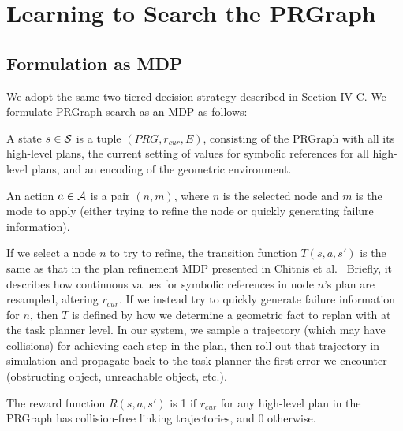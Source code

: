 \section{Learning to Search the PRGraph}
\subsection{Formulation as MDP}
We adopt the same two-tiered decision strategy described in Section IV-C.
We formulate PRGraph search as an MDP as follows:
\begin{tightlist}
\item A state $s \in \mathcal{S}$ is a tuple $(PRG, r_{cur}, E)$, consisting of the
PRGraph with all its high-level plans, the current setting of
values for symbolic references for all high-level plans, and
an encoding of the geometric environment.
\item An action $a \in \mathcal{A}$ is a pair $(n, m)$, where $n$ is the selected node and $m$ is
the mode to apply (either trying to refine the node or quickly generating failure information).
\item If we select a node $n$ to try to refine, the transition function $T(s, a, s')$ is the same
as that in the plan refinement MDP presented in Chitnis et al.~\cite{chitnis2015mlpc} Briefly,
it describes how continuous values for symbolic references in node $n$'s plan are resampled, altering $r_{cur}$. If we instead
try to quickly generate failure information for $n$, then $T$ is defined by how we determine a geometric
fact to replan with at the task planner level. In our system, we sample a trajectory (which may have
collisions) for achieving each step in the plan, then roll out that trajectory in simulation and propagate
back to the task planner the first error we encounter (obstructing object, unreachable object, etc.).
\item The reward function $R(s, a, s')$ is 1 if $r_{cur}$ for any high-level plan in the PRGraph
has collision-free linking trajectories, and 0 otherwise.
\end{tightlist}

